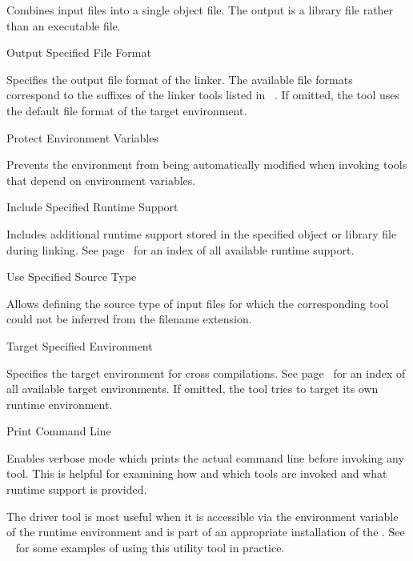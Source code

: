 \begin{description}
Combines input files into a single object file.
The output is a library file rather than an executable file.

\item{}\alignright Output Specified File Format\nopagebreak

Specifies the output file format of the linker.
The available file formats correspond to the suffixes of the linker tools listed in \Documentation{}~.
If omitted, the tool uses the default file format of the target environment.

\item{}\alignright Protect Environment Variables\nopagebreak

Prevents the environment from being automatically modified when invoking tools that depend on environment variables.

\item{}\alignright Include Specified Runtime Support\nopagebreak

Includes additional runtime support stored in the specified object or library file during linking.
\ifbook See page~\pageref{idx:runtime} for an index of all available runtime support. \fi

\item{}\alignright Use Specified Source Type\nopagebreak

Allows defining the source type of input files for which the corresponding tool could not be inferred from the filename extension.

\item{}\alignright Target Specified Environment\nopagebreak

Specifies the target environment for cross compilations.
\ifbook See page~\pageref{idx:environment} for an index of all available target environments. \fi
If omitted, the tool tries to target its own runtime environment.

\item{}\alignright Print Command Line\nopagebreak

Enables verbose mode which prints the actual command line before invoking any tool.
This is helpful for examining how and which tools are invoked and what runtime support is provided.

\end{description}

The  driver tool is most useful when it is accessible via the  environment variable of the runtime environment and is part of an appropriate installation of the \ecs{}.
See \Documentation{}~ for some examples of using this utility tool in practice.

\concludechapter
